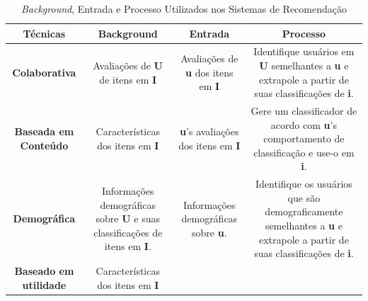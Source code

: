 \begin{table}[ht]
	\centering
	\caption{\emph{Background}, Entrada e Processo Utilizados nos Sistemas de Recomendação}
	\label{tab02}
	\begin{tabular}{cccc}
	\toprule
	\textbf{Técnicas} & \textbf{Background} & \textbf{Entrada}  &  \textbf{Processo}  \\ 
	\midrule
	\textbf{Colaborativa} & \begin{minipage} [t] {0.2\textwidth} \centering Avaliações de \textbf{U} de itens em \textbf{I}  \end{minipage}  & \begin{minipage} [t] {0.2\textwidth} \centering Avaliações de \textbf{u} dos itens em \textbf{I} \end{minipage}  &  \begin{minipage} [t] {0.2\textwidth}  Identifique usuários em \textbf{U} semelhantes a \textbf{u} e extrapole a partir de suas classificações de \textbf{i}.   \end{minipage}    \\ 
	\midrule
	\textbf{Baseada em Conteúdo} & \begin{minipage} [t] {0.2\textwidth} \centering Características dos itens em \textbf{I}\end{minipage}  & \begin{minipage} [t] {0.2\textwidth} \textbf{u}'s avaliações dos itens em \textbf{I} \end{minipage}  &   \begin{minipage} [t] {0.2\textwidth} Gere um classificador de acordo com \textbf{u}'s comportamento de classificação e use-o em \textbf{i}. \end{minipage} \\ 
	\midrule
	\textbf{Demográfica} & \begin{minipage} [t] {0.2\textwidth} \centering Informações demográficas sobre \textbf{U} e suas classificações de itens em \textbf{I}.    \end{minipage}   & \begin{minipage} [t] {0.2\textwidth} Informações demográficas sobre \textbf{u}. \end{minipage}  & \begin{minipage} [t] {0.2\textwidth} Identifique os usuários que são demograficamente semelhantes a \textbf{u} e extrapole a partir de suas classificações de \textbf{i}. \end{minipage}   \\ 
	\midrule
	\textbf{Baseado em utilidade} & \begin{minipage} [t] {0.2\textwidth} \centering Características dos itens em \textbf{I} \end{minipage}  & \begin{minipage} [t] {0.2\textwidth} 

\end{minipage}
\end{tabular}
\end{table}
